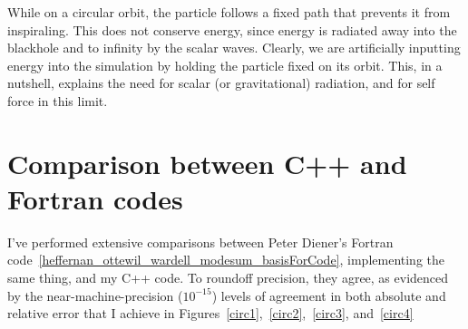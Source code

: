 While on a circular orbit, the particle follows a fixed path that prevents it from inspiraling. This does not conserve energy, since energy is radiated away into the blackhole and to infinity by the scalar waves. Clearly, we are artificially inputting energy into the simulation by holding the particle fixed on its orbit. This, in a nutshell, explains the need for scalar (or gravitational) radiation, and for self force in this limit. 


\section{Comparison between C++ and Fortran codes}

I've performed extensive comparisons between Peter Diener's Fortran code~\ref{heffernan_ottewil_wardell_modesum_basisForCode}, implementing the same thing, and my C++ code. To roundoff precision, they agree, as evidenced by the near-machine-precision ($10^{-15}$) levels of agreement in both absolute and relative error that I achieve in Figures~\ref{circ1},~\ref{circ2},~\ref{circ3}, and~\ref{circ4}

